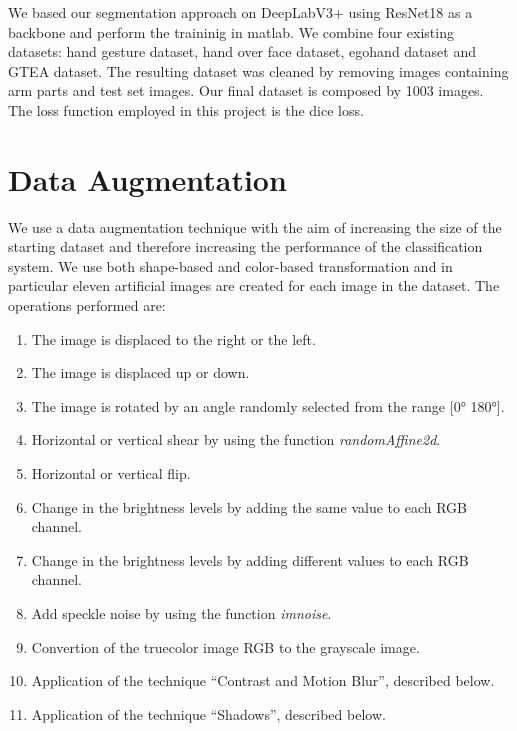 We based our segmentation approach on DeepLabV3+ using ResNet18 as a backbone and perform the traininig in matlab. 
We combine four existing datasets: hand gesture dataset, hand over face dataset, egohand dataset and GTEA dataset. The resulting dataset was cleaned by removing images containing arm parts and test set images. Our final dataset is composed by 1003 images.
The loss function employed in this project is the dice loss.
\section{Data Augmentation}
We use a data augmentation technique with the aim of increasing the size of the starting dataset and therefore increasing the performance of the classification system. We use both shape-based and color-based transformation and in particular eleven artificial images are created for each image in the dataset. \newline The operations performed are:
\begin{enumerate}
    \item The image is displaced to the right or the left.
    \item The image is displaced up or down.
    \item The image is rotated by an angle randomly selected from the range [0° 180°].
    \item Horizontal or vertical shear by using the function \textit{randomAffine2d}.
    \item Horizontal or vertical flip.
    \item Change in the brightness levels by adding the same value to each RGB channel.
    \item Change in the brightness levels by adding different values to each RGB channel.
    \item Add speckle noise by using the function \textit{imnoise}.
    \item  Convertion of the truecolor image RGB to the grayscale image.
    \item Application of the technique “Contrast and Motion Blur”, described below. 
    \item Application of the technique “Shadows”, described below. 
\end{enumerate}

